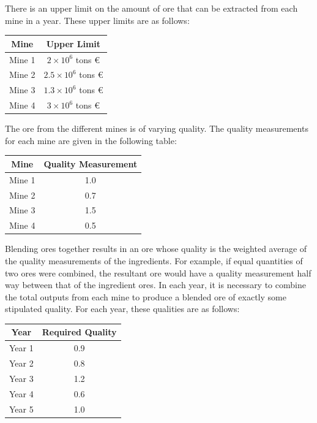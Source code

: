 \documentclass[a4paper,10pt]{article}
\begin{document}
There is an upper limit on the amount of ore that can be extracted from each mine in a year.
These upper limits are as follows:

\begin{table}[H]
\centering
\begin{tabular}{|c|c|}
\hline
Mine & Upper Limit \\
\hline
Mine 1 & $2 \times 10^6$ tons \euro \\
Mine 2 & $2.5 \times 10^6$ tons \euro \\
Mine 3 & $1.3 \times 10^6$ tons \euro \\
Mine 4 & $3 \times 10^6$ tons \euro \\
\hline
\end{tabular}
\end{table}

The ore from the different mines is of varying quality. The quality measurements for each mine
are given in the following table:

\begin{table}[H]
\centering
\begin{tabular}{|c|c|}
\hline
Mine & Quality Measurement \\
\hline
Mine 1 & 1.0 \\
Mine 2 & 0.7 \\
Mine 3 & 1.5 \\
Mine 4 & 0.5 \\
\hline
\end{tabular}
\end{table}

Blending ores together results in an ore whose quality is the weighted average of the quality
measurements of the ingredients. For example, if equal quantities of two ores were combined, the
resultant ore would have a quality measurement half way between that of the ingredient ores.
In each year, it is necessary to combine the total outputs from each mine to produce a blended
ore of exactly some stipulated quality. For each year, these qualities are as follows:

\begin{table}[H]
\centering
\begin{tabular}{|c|c|}
\hline
Year & Required Quality \\
\hline
Year 1 & 0.9 \\
Year 2 & 0.8 \\
Year 3 & 1.2 \\
Year 4 & 0.6 \\
Year 5 & 1.0 \\
\hline
\end{tabular}
\end{table}
\end{document}
